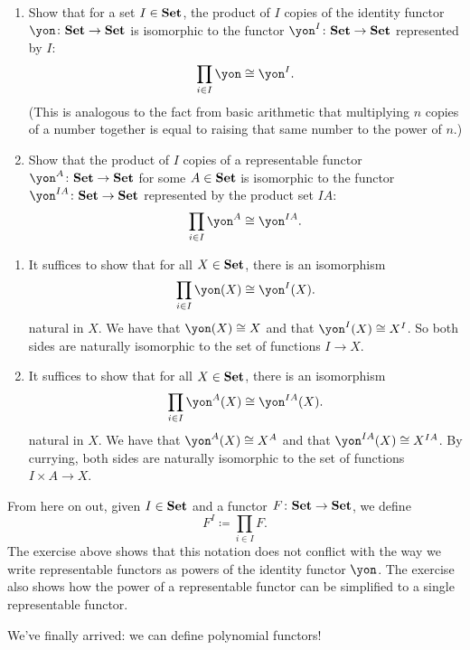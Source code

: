 \documentclass[Book-Poly]{subfiles}
\begin{document}
\begin{exercise}
\begin{enumerate}
    \item Show that for a set $I\in\mathbf{Set}$, the product of $I$ copies of the identity functor $\yon\colon\smset\to\smset$ is isomorphic to the functor $\yon^I\colon\smset\to\smset$ represented by $I$:
	\[
	    \prod_{i\in I}\yon\iso\yon^I.
	\]
	(This is analogous to the fact from basic arithmetic that multiplying $n$ copies of a number together is equal to raising that same number to the power of $n$.)
	\item Show that the product of $I$ copies of a representable functor $\yon^A\colon\smset\to\smset$ for some $A\in\mathbf{Set}$ is isomorphic to the functor $\yon^{IA}\colon\smset\to\smset$ represented by the product set $IA$:
	\[
	    \prod_{i\in I}\yon^A\iso\yon^{IA}.
	\]
\end{enumerate}
\begin{solution}
\begin{enumerate}
    \item It suffices to show that for all $X\in\mathbf{Set}$, there is an isomorphism
    \[
        \prod_{i\in I} \yon(X) \iso \yon^I(X).
    \]
    natural in $X$.
    We have that $\yon(X)\iso X$ and that $\yon^I(X)\iso X^I$.
    So both sides are naturally isomorphic to the set of functions $I\to X$.
    \item It suffices to show that for all $X\in\mathbf{Set}$, there is an isomorphism
    \[
        \prod_{i\in I} \yon^A(X) \iso \yon^{IA}(X).
    \]
    natural in $X$.
    We have that $\yon^A(X)\iso X^A$ and that $\yon^{IA}(X)\iso X^{IA}$.
    By currying, both sides are naturally isomorphic to the set of functions $I\times A\to X$.
\end{enumerate}
\end{solution}
\end{exercise}

\begin{remark}
From here on out, given $I\in\mathbf{Set}$ and a functor $F\colon\mathbf{Set}\to\mathbf{Set}$, we define
\[
    F^I\coloneqq\prod_{i\in I}F.
\]
The exercise above shows that this notation does not conflict with the way we write representable functors as powers of the identity functor $\yon$.
The exercise also shows how the power of a representable functor can be simplified to a single representable functor.
\end{remark}

We've finally arrived: we can define polynomial functors!
\end{document}
